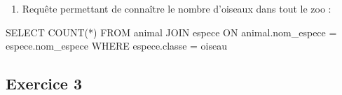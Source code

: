 \documentclass[
  letterpaper,
  DIV=11,
  numbers=noendperiod]{scrartcl}
\newenvironment{Shaded}{\begin{snugshade}}{\end{snugshade}}
\newcommand{\FunctionTok}[1]{\textcolor[rgb]{0.28,0.35,0.67}{#1}}
\newcommand{\KeywordTok}[1]{\textcolor[rgb]{0.00,0.23,0.31}{#1}}
\newcommand{\NormalTok}[1]{\textcolor[rgb]{0.00,0.23,0.31}{#1}}
\newcommand{\OperatorTok}[1]{\textcolor[rgb]{0.37,0.37,0.37}{#1}}
\newcommand{\StringTok}[1]{\textcolor[rgb]{0.13,0.47,0.30}{#1}}
\providecommand{\tightlist}{%
  \setlength{\itemsep}{0pt}\setlength{\parskip}{0pt}}\usepackage{longtable,booktabs,array}
\begin{document}
\begin{enumerate}
  \begin{enumerate}
  \def\labelenumii{\alph{enumii}.}
  \setcounter{enumii}{1}
  \tightlist
  \item
    Requête permettant de connaître le nombre d'oiseaux dans tout le zoo
    :
  \end{enumerate}

\begin{Shaded}
\begin{Highlighting}[]
\KeywordTok{SELECT} \FunctionTok{COUNT}\NormalTok{(}\OperatorTok{*}\NormalTok{)}
\KeywordTok{FROM}\NormalTok{ animal}
\KeywordTok{JOIN}\NormalTok{ espece }\KeywordTok{ON}\NormalTok{ animal.nom\_espece }\OperatorTok{=}\NormalTok{ espece.nom\_espece}
\KeywordTok{WHERE}\NormalTok{ espece.classe }\OperatorTok{=} \StringTok{\textquotesingle{}oiseau\textquotesingle{}}
\end{Highlighting}
\end{Shaded}
\end{enumerate}

\hypertarget{exercice-3}{%
\subsection{Exercice 3}\label{exercice-3}}
\end{document}
